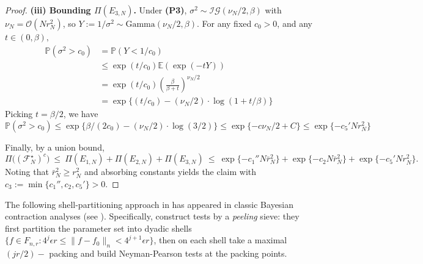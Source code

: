 \documentclass[11pt]{article}
\theoremstyle{plain}
\theoremstyle{definition}
\theoremstyle{plain}
\begin{document}
\begin{proof}
\medskip\noindent\textbf{(iii) Bounding $\Pi(E_{3,N})$.}
Under {\textbf{(P3)}}, $\sigma^2\sim \mathcal{IG}(\nu_N/2,\beta)$ with $\nu_N = \mathcal{O}(N r_N ^2)$, so $Y:=1/\sigma^2\sim\mathrm{Gamma}(\nu_N/2,\beta)$.
For any fixed $c_0>0$, and any $ t \in (0,\beta),$
\begin{equation*}
    \begin{split}
        \mathbb{P}(\sigma^2 > c_0) & = \mathbb{P}(Y < 1/c_0) \\
        & \le \exp(t/c_0) \mathbb{E}(\exp(-tY)) \\
        & = \exp(t/c_0)\left(\frac{\beta}{\beta+t} \right)^{\nu_N/2} \\
        & = \exp \{ (t/c_0)  - (\nu_N/2) \cdot \log(1+t/\beta)\}
    \end{split}
\end{equation*}
Picking $t=\beta/2$, we have 
\[
\mathbb{P}(\sigma^2 > c_0) \le \exp\{\beta/(2c_0) - (\nu_N/2) \cdot \log(3/2) \} \le \exp\{-c \nu_N/2 + C\} \le \exp\{-c_5 ' Nr_N^2\}
\]

\medskip
Finally, by a union bound,
\[
\Pi\bigl((\mathcal F_N^\star)^c\bigr)\ \le\ \Pi(E_{1,N})+\Pi(E_{2,N})+\Pi(E_{3,N})
\ \le\ \exp \{-c_1'' N\bar r_N^2\}+\exp\{-c_2 N\bar r_N^2\}+\exp\{-c_5' N r_N^2\}.
\]
Noting that $\bar{r}_N^2 \ge r_N ^2$ and absorbing constants yields the claim with $c_3:=\min\{c_1'',c_2,c_5'\}>0$.
\end{proof}
The following shell-partitioning approach in  has appeared in classic Bayesian contraction analyses (see \citet[Thm 8.12]{Ghoshal2017}). Specifically, \citet[Lemma 13]{vandervaart2011} construct tests by a \emph{peeling} sieve: they first partition the parameter set into dyadic shells $\{f \in F_{n,r}: 4^j \epsilon r \le \|f-f_0\|_n < 4^{j+1} \epsilon r\}$, then on each shell take a maximal $(jr/2)-$ packing and build Neyman-Pearson tests at the packing points.
\end{document}
